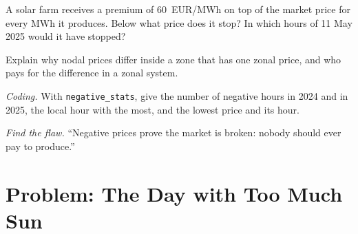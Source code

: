 \begin{exercise}[$\star\star$]\label{exo:m3:power-markets-design:5}
A solar farm receives a premium of \qty{60}{EUR/MWh} on top of the market price for every
MWh it produces. Below what price does it stop? In which hours of 11 May 2025 would it
have stopped?
\end{exercise}

\begin{exercise}[$\star\star$]\label{exo:m3:power-markets-design:6}
Explain why nodal prices differ inside a zone that has one zonal price, and who pays for
the difference in a zonal system.
\end{exercise}

\begin{exercise}[$\star\star\star$]\label{exo:m3:power-markets-design:7}
\emph{Coding.} With \texttt{negative\_stats}, give the number of negative hours in 2024 and
in 2025, the local hour with the most, and the lowest price and its hour.
\end{exercise}

\begin{exercise}[$\star\star\star$]\label{exo:m3:power-markets-design:8}
\emph{Find the flaw.} ``Negative prices prove the market is broken: nobody should ever pay
to produce.''
\end{exercise}

\section{Problem: The Day with Too Much Sun}

